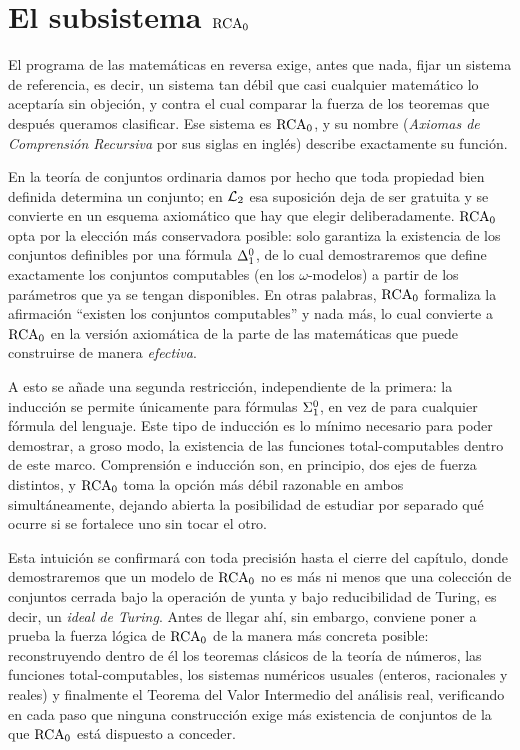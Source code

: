 \chapter{El subsistema $\mathrm{RCA}_{0}$}

El programa de las matemáticas en reversa exige, antes que nada, fijar un sistema de referencia, es decir, un sistema tan débil que casi cualquier matemático lo aceptaría sin objeción, y contra el cual comparar la fuerza de los teoremas que después queramos clasificar. Ese sistema es $\mathrm{RCA}_{0}$, y su nombre (\emph{Axiomas de Comprensión Recursiva} por sus siglas en inglés) describe exactamente su función.

En la teoría de conjuntos ordinaria damos por hecho que toda propiedad bien definida determina un conjunto; en $\mathcal{L}_{2}$ esa suposición deja de ser gratuita y se convierte en un esquema axiomático que hay que elegir deliberadamente. $\mathrm{RCA}_{0}$ opta por la elección más conservadora posible: solo garantiza la existencia de los conjuntos definibles por una fórmula $\Delta_{1}^{0}$, de lo cual demostraremos que define exactamente los conjuntos computables (en los $\omega$-modelos) a partir de los parámetros que ya se tengan disponibles. En otras palabras, $\mathrm{RCA}_{0}$ formaliza la afirmación ``existen los conjuntos computables'' y nada más, lo cual convierte a $\mathrm{RCA}_{0}$ en la versión axiomática de la parte de las matemáticas que puede construirse de manera \emph{efectiva}.

A esto se añade una segunda restricción, independiente de la primera: la inducción se permite únicamente para fórmulas $\Sigma_{1}^{0}$, en vez de para cualquier fórmula del lenguaje. Este tipo de inducción es lo mínimo necesario para poder demostrar, a groso modo, la existencia de las funciones total-computables dentro de este marco. Comprensión e inducción son, en principio, dos ejes de fuerza distintos, y $\mathrm{RCA}_{0}$ toma la opción más débil razonable en ambos simultáneamente, dejando abierta la posibilidad de estudiar por separado qué ocurre si se fortalece uno sin tocar el otro.

Esta intuición se confirmará con toda precisión hasta el cierre del capítulo, donde demostraremos que un modelo de $\mathrm{RCA}_{0}$ no es más ni menos que una colección de conjuntos cerrada bajo la operación de yunta y bajo reducibilidad de Turing, es decir, un \emph{ideal de Turing}. Antes de llegar ahí, sin embargo, conviene poner a prueba la fuerza lógica de $\mathrm{RCA}_{0}$ de la manera más concreta posible: reconstruyendo dentro de él los teoremas clásicos de la teoría de números, las funciones total-computables, los sistemas numéricos usuales (enteros, racionales y reales) y finalmente el Teorema del Valor Intermedio del análisis real, verificando en cada paso que ninguna construcción exige más existencia de conjuntos de la que $\mathrm{RCA}_{0}$ está dispuesto a conceder.


